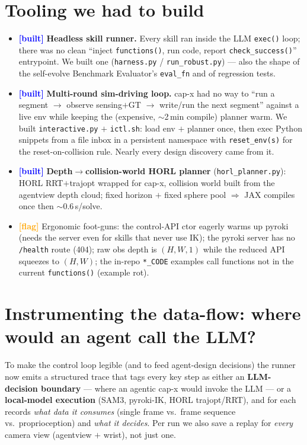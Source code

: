 \documentclass[11pt]{article}
\newcommand{\flag}{\textcolor{orange}{\textbf{[flag]}}}
\newcommand{\built}{\textcolor{blue}{\textbf{[built]}}}
\newcommand{\code}[1]{\texttt{#1}}
\begin{document}
\section{Tooling we had to build}
\begin{itemize}
  \item \built{} \textbf{Headless skill runner.} Every skill ran inside the LLM
        \code{exec()} loop; there was no clean ``inject \code{functions()}, run code, report
        \code{check\_success()}'' entrypoint. We built one (\code{harness.py} /
        \code{run\_robust.py}) --- also the shape of the self-evolve Benchmark Evaluator's
        \code{eval\_fn} and of regression tests.
  \item \built{} \textbf{Multi-round sim-driving loop.} cap-x had no way to ``run a segment
        $\to$ observe sensing$+$GT $\to$ write/run the next segment'' against a live env while
        keeping the (expensive, $\sim$2\,min compile) planner warm. We built
        \code{interactive.py} $+$ \code{ictl.sh}: load env $+$ planner once, then exec Python
        snippets from a file inbox in a persistent namespace with \code{reset\_env(s)} for the
        reset-on-collision rule. Nearly every design discovery came from it.
  \item \built{} \textbf{Depth$\to$collision-world HORL planner} (\code{horl\_planner.py}):
        HORL RRT$+$trajopt wrapped for cap-x, collision world built from the agentview depth
        cloud; fixed horizon $+$ fixed sphere pool $\Rightarrow$ JAX compiles once then
        $\sim$0.6\,s/solve.
  \item \flag{} Ergonomic foot-guns: the control-API ctor eagerly warms up pyroki (needs the
        server even for skills that never use IK); the pyroki server has no \code{/health}
        route (404); raw obs depth is $(H,W,1)$ while the reduced API squeezes to $(H,W)$;
        the in-repo \code{*\_CODE} examples call functions not in the current
        \code{functions()} (example rot).
\end{itemize}

\section{Instrumenting the data-flow: where would an agent call the LLM?}
\label{sec:dataflow}
To make the control loop legible (and to feed agent-design decisions) the runner now
emits a structured trace that tags every key step as either an \textbf{LLM-decision
boundary} --- where an agentic cap-x would invoke the LLM --- or a \textbf{local-model
execution} (SAM3, pyroki-IK, HORL trajopt/RRT), and for each records \emph{what data it
consumes} (single frame vs.\ frame sequence vs.\ proprioception) and \emph{what it
decides}. Per run we also save a replay for \emph{every} camera view (agentview $+$ wrist),
not just one.
\end{document}
